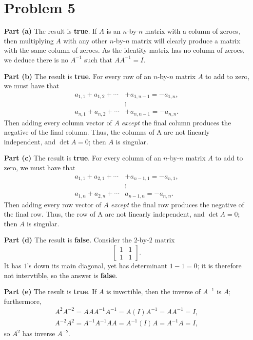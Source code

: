 \documentclass[11pt]{article}
\begin{document}
\section{Problem 5}

\textbf{Part (a)} The result is \textbf{true}. If $A$ is an $n$-by-$n$ matrix with a column of zeroes, then multiplying $A$ with any other $n$-by-$n$ matrix will clearly produce a matrix with the same column of zeroes. As the identity matrix has no column of zeroes, we deduce there is no $A^{-1}$ such that $A A^{-1} = I$.

\textbf{Part (b)} The result is \textbf{true}. For every row of an $n$-by-$n$ matrix $A$ to add to zero, we must have that
\begin{align*}
	a_{1, 1} + a_{1,2} + \cdots & + a_{1, n - 1} = - a_{1, n}, \\
	& \vdots \\
	a_{n, 1} + a_{n,2} + \cdots & + a_{n, n - 1} = - a_{n, n}.
\end{align*}
Then adding every column vector of $A$ \textit{except} the final column produces the negative of the final column. Thus, the columns of A are not linearly independent, and $\det A = 0$; then $A$ is singular.

\textbf{Part (c)} The result is \textbf{true}. For every column of an $n$-by-$n$ matrix $A$ to add to zero, we must have that
\begin{align*}
	a_{1, 1} + a_{2,1} + \cdots & + a_{n - 1, 1} = - a_{n, 1}, \\
	& \vdots \\
	a_{1, n} + a_{2,n} + \cdots & a_{n - 1, n} = - a_{n, n}.
\end{align*}
Then adding every row vector of $A$ \textit{except} the final row produces the negative of the final row. Thus, the row of A are not linearly independent, and $\det A = 0$; then $A$ is singular.

\textbf{Part (d)} The result is \textbf{false}. Consider the $2$-by-$2$ matrix 
\[
	\begin{bmatrix} 1 & 1 \\ 1 & 1 \end{bmatrix}.
\]
It has $1$'s down its main diagonal, yet has determinant $1 - 1 = 0$; it is therefore not intervtible, so the answer is \textbf{false}.

\textbf{Part (e)} The result is \textbf{true}. If $A$ is invertible, then the inverse of $A^{-1}$ is $A$; furthermore,
\begin{align*}
	A^{2} A^{-2} = A A A^{-1} A^{-1} = A (I) A^{-1} = A A^{-1} = I, \\
	A^{-2} A^{2} = A^{-1} A^{-1} A A = A^{-1} (I) A = A^{-1} A = I,
\end{align*}
so $A^{2}$ has inverse $A^{-2}$. 

\end{document}
